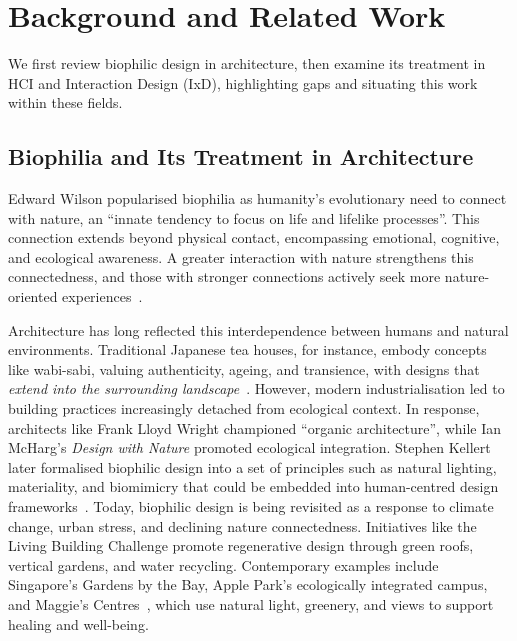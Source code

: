 \section{Background and Related Work}
\label{sec:ch4-background-related}
We first review biophilic design in architecture, then examine its treatment in HCI and Interaction Design (IxD), highlighting gaps and situating this work within these fields.

\subsection{Biophilia and Its Treatment in Architecture}
Edward Wilson popularised biophilia as humanity’s evolutionary need to connect with nature, an ``innate tendency to focus on life and lifelike processes''\cite{wilson1986biophilia}. This connection extends beyond physical contact, encompassing emotional, cognitive, and ecological awareness\cite{ulrich1984view}. A greater interaction with nature strengthens this connectedness, and those with stronger connections actively seek more nature-oriented experiences~\cite{ulrich1984view}.

Architecture has long reflected this interdependence between humans and natural environments. Traditional Japanese tea houses, for instance, embody concepts like wabi-sabi, valuing authenticity, ageing, and transience, with designs that \emph{extend into the surrounding landscape}~\cite{juniper2011wabi}. However, modern industrialisation led to building practices increasingly detached from ecological context. In response, architects like Frank Lloyd Wright championed ``organic architecture''\cite{mumford1989form}, while Ian McHarg’s \emph{Design with Nature} promoted ecological integration\cite{mcharg1969design}. Stephen Kellert later formalised biophilic design into a set of principles such as natural lighting, materiality, and biomimicry that could be embedded into human-centred design frameworks~\cite{kellert1995biophilia}. Today, biophilic design is being revisited as a response to climate change, urban stress, and declining nature connectedness. Initiatives like the Living Building Challenge promote regenerative design through green roofs, vertical gardens, and water recycling. Contemporary examples include Singapore’s Gardens by the Bay, Apple Park’s ecologically integrated campus, and Maggie’s Centres~\cite{tekin2023impact}, which use natural light, greenery, and views to support healing and well-being. 


